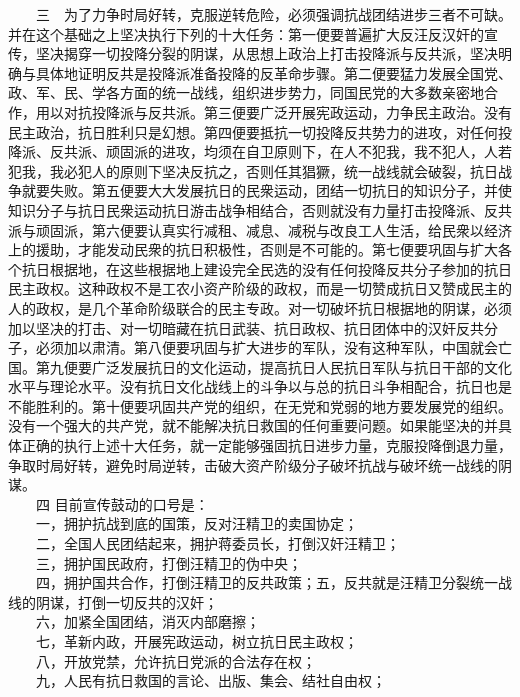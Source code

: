 \documentclass[cn,11pt,chinese]{elegantbook}
\begin{document}
　　三　为了力争时局好转，克服逆转危险，必须强调抗战团结进步三者不可缺。并在这个基础之上坚决执行下列的十大任务：第一便要普遍扩大反汪反汉奸的宣传，坚决揭穿一切投降分裂的阴谋，从思想上政治上打击投降派与反共派，坚决明确与具体地证明反共是投降派准备投降的反革命步骤。第二便要猛力发展全国党、政、军、民、学各方面的统一战线，组织进步势力，同国民党的大多数亲密地合作，用以对抗投降派与反共派。第三便要广泛开展宪政运动，力争民主政治。没有民主政治，抗日胜利只是幻想。第四便要抵抗一切投降反共势力的进攻，对任何投降派、反共派、顽固派的进攻，均须在自卫原则下，在人不犯我，我不犯人，人若犯我，我必犯人的原则下坚决反抗之，否则任其猖獗，统一战线就会破裂，抗日战争就要失败。第五便要大大发展抗日的民衆运动，团结一切抗日的知识分子，并使知识分子与抗日民衆运动抗日游击战争相结合，否则就没有力量打击投降派、反共派与顽固派，第六便要认真实行减租、减息、减税与改良工人生活，给民衆以经济上的援助，才能发动民衆的抗日积极性，否则是不可能的。第七便要巩固与扩大各个抗日根据地，在这些根据地上建设完全民选的没有任何投降反共分子参加的抗日民主政权。这种政权不是工农小资产阶级的政权，而是一切赞成抗日又赞成民主的人的政权，是几个革命阶级联合的民主专政。对一切破坏抗日根据地的阴谋，必须加以坚决的打击、对一切暗藏在抗日武装、抗日政权、抗日团体中的汉奸反共分子，必须加以肃清。第八便要巩固与扩大进步的军队，没有这种军队，中国就会亡国。第九便要广泛发展抗日的文化运动，提高抗日人民抗日军队与抗日干部的文化水平与理论水平。没有抗日文化战线上的斗争以与总的抗日斗争相配合，抗日也是不能胜利的。第十便要巩固共产党的组织，在无党和党弱的地方要发展党的组织。没有一个强大的共产党，就不能解决抗日救国的任何重要问题。如果能坚决的并具体正确的执行上述十大任务，就一定能够强固抗日进步力量，克服投降倒退力量，争取时局好转，避免时局逆转，击破大资产阶级分子破坏抗战与破坏统一战线的阴谋。\\
　　四 目前宣传鼓动的口号是：\\
　　一，拥护抗战到底的国策，反对汪精卫的卖国协定；\\
　　二，全国人民团结起来，拥护蒋委员长，打倒汉奸汪精卫；\\
　　三，拥护国民政府，打倒汪精卫的伪中央；\\
　　四，拥护国共合作，打倒汪精卫的反共政策；五，反共就是汪精卫分裂统一战线的阴谋，打倒一切反共的汉奸；\\
　　六，加紧全国团结，消灭内部磨擦；\\
　　七，革新内政，开展宪政运动，树立抗日民主政权；\\
　　八，开放党禁，允许抗日党派的合法存在权；\\
　　九，人民有抗日救国的言论、出版、集会、结社自由权；\\
\end{document}
